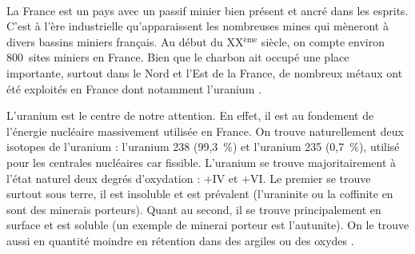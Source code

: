 \documentclass{article}
\begin{document}
\paragraph{} La France est un pays avec un passif minier bien présent et ancré dans les esprits. C’est à l’ère industrielle qu’apparaissent les nombreuses mines qui mèneront à divers bassins miniers français. Au début du XX$^\text{ème}$ siècle, on compte environ 800~sites miniers en France. Bien que le charbon ait occupé une place importante, surtout dans le Nord et l'Est de la France, de nombreux métaux ont été exploités en France dont notamment l’uranium \cite{ledoux_notions_2020}.



L’uranium est le centre de notre attention. En effet, il est au fondement de l’énergie nucléaire massivement utilisée en France. On trouve naturellement deux isotopes de l'uranium : l'uranium 238 (99,3~\%) et l'uranium 235 (0,7~\%), utilisé pour les centrales nucléaires car fissible. L'uranium se trouve majoritairement à l'état naturel deux degrés d’oxydation : +IV et +VI. Le premier se trouve surtout sous terre, il est insoluble et est prévalent (l'uraninite ou la coffinite en sont des minerais porteurs). Quant au second, il se trouve principalement en surface et est soluble (un exemple de minerai porteur est l'autunite). On le trouve aussi en quantité moindre en rétention dans des argiles ou des oxydes \cite{descostes_introduction_2020}.
\end{document}
